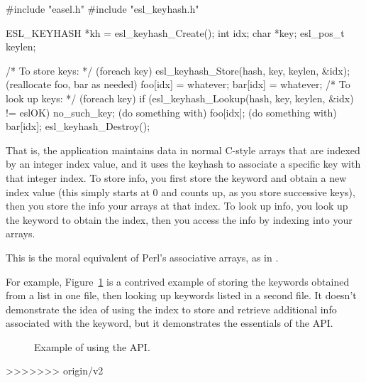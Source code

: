 \begin{cchunk}
       #include "easel.h"
       #include "esl_keyhash.h"
     
       ESL_KEYHASH *kh = esl_keyhash_Create();
       int          idx;
       char        *key;
       esl_pos_t    keylen;
       
       /* To store keys: */
       (foreach key) {
          esl_keyhash_Store(hash, key, keylen, &idx);       
          (reallocate foo, bar as needed)
          foo[idx] = whatever;
          bar[idx] = whatever;
       }     
       /* To look up keys: */
       (foreach key) {
          if (esl_keyhash_Lookup(hash, key, keylen, &idx) != eslOK) { no_such_key; }
          (do something with) foo[idx];
          (do something with) bar[idx];
       }   
       esl_keyhash_Destroy();
\end{cchunk}

That is, the application maintains data in normal C-style arrays that
are indexed by an integer index value, and it uses the keyhash to
associate a specific key with that integer index. To store info, you
first store the keyword and obtain a new index value (this simply
starts at 0 and counts up, as you store successive keys), then you
store the info your arrays at that index. To look up info, you look up
the keyword to obtain the index, then you access the info by indexing
into your arrays.

This is the moral equivalent of Perl's associative arrays, as in
.

For example, Figure~\ref{fig:keyhash_example} is a contrived example
of storing the keywords obtained from a list in one file, then looking
up keywords listed in a second file. It doesn't demonstrate the idea
of using the index to store and retrieve additional info associated
with the keyword, but it demonstrates the essentials of the
 API.

\begin{figure}

\caption{Example of using the  API.}
\label{fig:keyhash_example}
\end{figure}

>>>>>>> origin/v2
